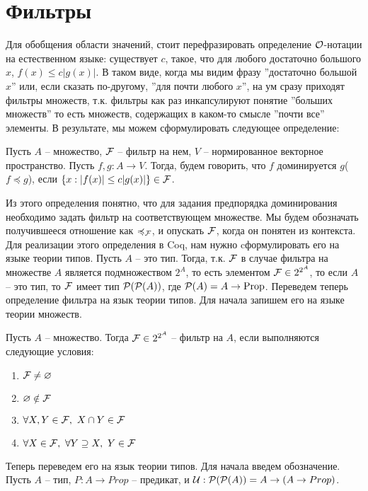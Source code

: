\section{Фильтры}
Для обобщения области значений, стоит перефразировать определение $\mathcal{O}$-нотации на естественном языке: существует $c$, такое, что
для любого достаточно большого $x$, $f(x) \leq c|g(x)|$. В таком виде, когда мы видим фразу ''достаточно большой $x$'' или, если сказать по-другому,
''для почти любого $x$'', на ум сразу приходят фильтры множеств, т.к. фильтры как раз инкапсулируют понятие ''больших множеств'' то есть множеств, содержащих
в каком-то смысле ''почти все'' элементы. В результате, мы можем сформулировать следующее определение:
\begin{definition}
	Пусть $A$ -- множество, $\mathcal{F}$ -- фильтр на нем, $V$ -- нормированное векторное пространство. Пусть $f, g: A \to V$. Тогда, будем говорить, что
	$f$ доминируется $g$($f \preccurlyeq g$), если $\{x: |f(x)| \leq c|g(x)|\} \in \mathcal{F}$.
\end{definition}
Из этого определения понятно, что для задания предпорядка доминирования необходимо задать фильтр на соответствующем множестве. Мы будем обозначать
получившееся отношение как $\preccurlyeq_{\mathcal{F}}$, и опускать $\mathcal{F}$, когда он понятен из контекста. \\
Для реализации этого определения в Coq, нам нужно cформулировать его на языке теории типов. Пусть $A$ -- это тип. Тогда, т.к. $\mathcal{F}$ в случае фильтра на
множестве $A$ является подмножеством $2^{A}$, то есть элементом $\mathcal{F} \in 2^{2^{A}}$, то если $A$ -- это тип, то $\mathcal{F}$ имеет тип $\mathcal{P}(\mathcal{P}(A))$, где
$\mathcal{P}(A) = A \to \text{Prop}$. Переведем теперь определение фильтра на язык теории типов. Для начала запишем его на языке теории множеств.
\begin{definition}
	Пусть $A$ -- множество. Тогда $\mathcal{F} \in 2^{2^{A}}$ -- фильтр на $A$, если выполняются следующие условия:
	\begin{enumerate}
		\item $\mathcal{F} \neq \varnothing$
		\item $\varnothing \notin \mathcal{F}$
		\item $\forall X,Y \in \mathcal{F},\ X \cap Y \in \mathcal{F}$
		\item $\forall X \in \mathcal{F},\ \forall Y \supseteq X,\ Y \in \mathcal{F}$
	\end{enumerate}
\end{definition}
Теперь переведем его на язык теории типов. Для начала введем обозначение. Пусть $A$ -- тип, $P: A \to Prop$ -- предикат, и $\mathcal{U}: \mathcal{P}(\mathcal{P}(A)) = A \to (A \to Prop)$.
